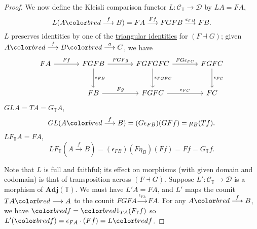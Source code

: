 \documentclass{article}
\makeatletter
\def\mathcolor#1#{\@mathcolor{#1}}
\def\@mathcolor#1#2#3{%
  \protect\leavevmode
  \begingroup
    \color#1{#2}#3%
  \endgroup
}
\newcommand{\green}[1]{\mathcolor{bred}{#1}}
\newcommand{\cc}{\mathscr{C}}
\newcommand{\dc}{\mathscr{D}}
\let\to\longrightarrow
\makeatother
\begin{document}
\begin{proof}
  We now define the Kleisli comparison functor $L: \cc_\mathbb{T} \to \dc$ by $LA = FA$,
  \begin{equation*}
  L(A \green{\overset{f}\to} B) = FA \overset{Ff}\to FGFB \overset{\epsilon_{FB}}\to FB.
  \end{equation*}
  $L$ preserves identities by one of the \hyperlink{def:triId}{triangular identities} for $(F \dashv G)$; given $A \green{\overset{f}\to} B \green{\overset{g}\to} C$, we have
  \begin{equation*}
    \begin{tikzcd}[column sep=large, row sep=large]
    FA \rar{Ff} & FGFB \rar{FGFg} \dar{\epsilon_{FB}}& FGFGFC \dar{\epsilon_{FGFC}}\rar{FG\epsilon_{FC}}& FGFC \dar{\epsilon_{FC}} \\
                & FB \rar{Fg}& FGFC \rar{\epsilon_{FC}} & FC
  \end{tikzcd}
  \end{equation*}
  $GLA = TA = G_\mathbb{T}A$, \begin{equation*}GL(A \green{\overset{f}\to} B) = (G \epsilon_{FB}) (GFf) = \mu_B(Tf).\end{equation*}
  $LF_\mathbb{T}A = FA$, \begin{equation*}LF_\mathbb{T}(A \overset{f}\to B) = (\epsilon_{FB})(F\eta_B) (Ff) = Ff = G_{\mathbb{T}} f.\end{equation*}

  Note that $L$ is full and faithful; its effect on morphisms (with given domain and codomain) is that of transposition across $(F \dashv G)$.
  Suppose $L': \cc_\mathbb{T} \to \dc$ is a morphism of $\mathbf{Adj}(\mathbb{T})$.
  We must have $L'A = FA$, and $L'$ maps the counit $TA \green{\to} A$ to the counit $FGFA \overset{\epsilon_{FA}} \to FA$.
  For any $A \green{\overset{f}\to} B$, we have $\green{f}=\green{1_{TA} (F_\mathbb{T} f)}$ so $L'(\green{f}) = \epsilon_{FA} \cdot (Ff) = L\green{f}$.
\end{proof}
\printindex
\end{document}
